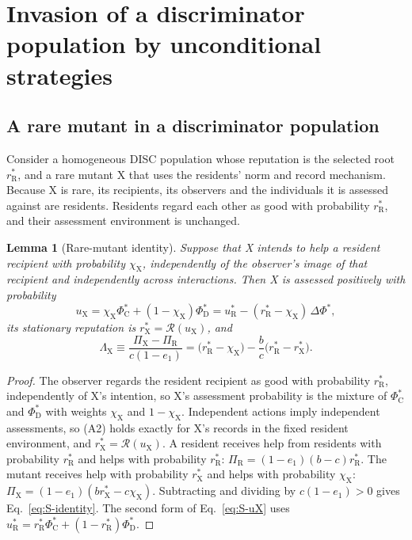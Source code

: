 \documentclass[fleqn,10pt]{article}
\theoremstyle{plain}
\newtheorem{lemma}[proposition]{Lemma}
\theoremstyle{remark}
\newcommand{\Rm}{\mathcal R}
\newcommand{\C}{\mathrm C}
\newcommand{\D}{\mathrm D}
\newcommand{\rR}{r^*_{\mathrm R}}
\newcommand{\uR}{u^*_{\mathrm R}}
\begin{document}
\section{Invasion of a discriminator population by unconditional strategies}
\label{sec:invasion}

\subsection{A rare mutant in a discriminator population}
Consider a homogeneous DISC population whose reputation is the selected root
$\rR$, and a rare mutant X that uses the residents' norm and record mechanism.
Because X is rare, its recipients, its observers and the individuals it is
assessed against are residents. Residents regard each other as good with
probability $\rR$, and their assessment environment is unchanged.

\begin{lemma}[Rare-mutant identity]\label{lem:identity}
Suppose that X intends to help a resident recipient with probability
$\chi_{\mathrm X}$, independently of the observer's image of that recipient and
independently across interactions. Then X is assessed positively with
probability
\begin{equation}
u_{\mathrm X}=\chi_{\mathrm X}\Phi^*_\C+(1-\chi_{\mathrm X})\Phi^*_\D
=\uR-(\rR-\chi_{\mathrm X})\,\Delta\Phi^*,
\label{eq:S-uX}
\end{equation}
its stationary reputation is $r^*_{\mathrm X}=\Rm(u_{\mathrm X})$, and
\begin{equation}
\Lambda_{\mathrm X}\equiv\frac{\Pi_{\mathrm X}-\Pi_{\mathrm R}}{c(1-e_1)}
=\bigl(\rR-\chi_{\mathrm X}\bigr)-\frac bc\bigl(\rR-r^*_{\mathrm X}\bigr).
\label{eq:S-identity}
\end{equation}
\end{lemma}
\begin{proof}
The observer regards the resident recipient as good with probability $\rR$,
independently of X's intention, so X's assessment probability is the mixture of
$\Phi_\C^*$ and $\Phi_\D^*$ with weights $\chi_{\mathrm X}$ and $1-\chi_{\mathrm X}$.
Independent actions imply independent assessments, so (A2) holds exactly for
X's records in the fixed resident environment, and
$r^*_{\mathrm X}=\Rm(u_{\mathrm X})$. A resident receives help from residents with
probability $\rR$ and helps with probability $\rR$:
$\Pi_{\mathrm R}=(1-e_1)(b-c)\rR$. The mutant receives help with probability
$r^*_{\mathrm X}$ and helps with probability $\chi_{\mathrm X}$:
$\Pi_{\mathrm X}=(1-e_1)(br^*_{\mathrm X}-c\chi_{\mathrm X})$. Subtracting and dividing
by $c(1-e_1)>0$ gives Eq.~\eqref{eq:S-identity}. The second form of
Eq.~\eqref{eq:S-uX} uses $\uR=\rR\Phi^*_\C+(1-\rR)\Phi^*_\D$.
\end{proof}
\end{document}
